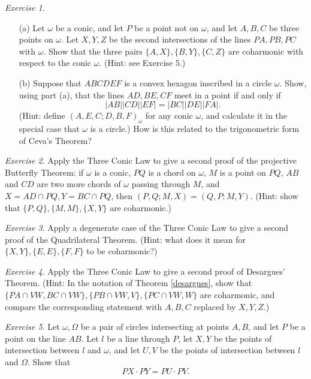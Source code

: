 \documentclass[letterpaper,11pt]{article}
\theoremstyle{definition}
\theoremstyle{remark}
\newtheorem{exer}{Exercise}
\begin{document}
\begin{exer}
\begin{itemize}
\item[(a)] Let $\omega$ be a conic, and let $P$ be a point not on $\omega$, and let $A,B,C$ be three points on $\omega$. Let $X,Y,Z$ be the second  intersections of the lines $PA,PB,PC$ with $\omega$. Show that the three pairs $\{A,X\}, \{B,Y\}, \{C,Z\}$ are coharmonic with respect to the conic $\omega$. (Hint: see Exercise 5.)
\item[(b)] Suppose that $ABCDEF$ is a convex hexagon inscribed in a circle $\omega$. Show, using part (a), that the lines $AD, BE, CF$ meet in a point if and only if
\[
|AB||CD||EF| = |BC||DE||FA|.
\]
(Hint: define $(A,E,C;D,B,F)_{\omega}$ for any conic $\omega$, and calculate it in the special case that $\omega$ is a circle.) How is this related to the trigonometric form of Ceva's Theorem?
\end{itemize}
\end{exer}

\begin{exer} Apply the Three Conic Law to give a second proof of the projective Butterfly Theorem: if $\omega$ is a conic, $PQ$ is a chord on $\omega$, $M$ is a point on $PQ$, $AB$ and $CD$ are two more chords of $\omega$ passing through $M$, and $X = AD\cap PQ, Y = BC\cap PQ$, then $(P,Q;M,X) = (Q,P;M,Y)$. (Hint: show that $\{P,Q\}, \{M,M\}, \{X,Y\}$ are coharmonic.)
\end{exer}

\begin{exer} Apply a degenerate case of the Three Conic Law to give a second proof of the Quadrilateral Theorem. (Hint: what does it mean for $\{X,Y\},\{E,E\},\{F,F\}$ to be coharmonic?)
\end{exer}

\begin{exer} Apply the Three Conic Law to give a second proof of Desargues' Theorem. (Hint: In the notation of Theorem \ref{desargues}, show that $\{PA\cap VW,BC\cap VW\},\{PB\cap VW, V\}, \{PC\cap VW,W\}$ are coharmonic, and compare the corresponding statement with $A,B,C$ replaced by $X,Y,Z$.)
\end{exer}

\begin{exer} Let $\omega, \Omega$ be a pair of circles intersecting at points $A,B$, and let $P$ be a point on the line $AB$. Let $l$ be a line through $P$, let $X,Y$ be the points of intersection between $l$ and $\omega$, and let $U,V$ be the points of intersection between $l$ and $\Omega$. Show that
\[
PX\cdot PY = PU\cdot PV.
\]
\end{exer}
\end{document}
